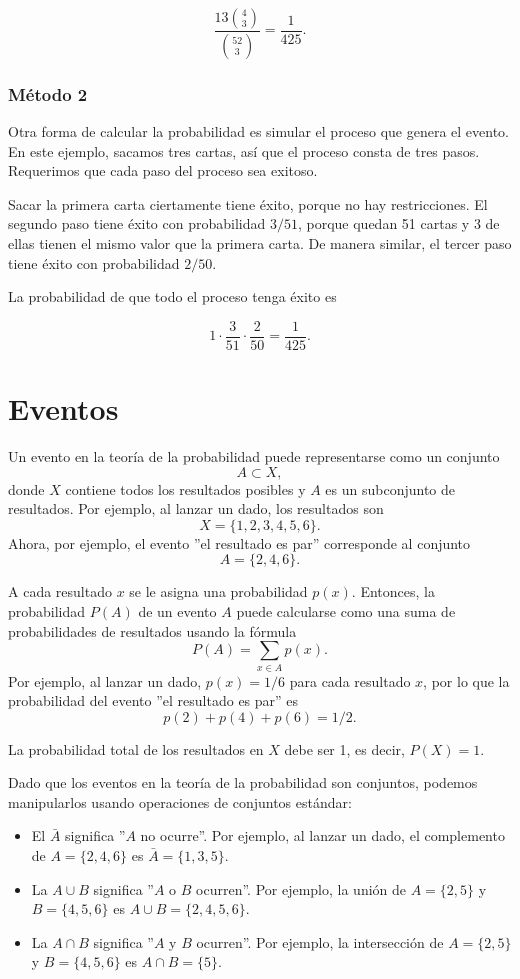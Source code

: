 \[\frac{13 {4 \choose 3}}{{52 \choose 3}} = \frac{1}{425}.\]

\subsubsection*{Método 2}

Otra forma de calcular la probabilidad es
simular el proceso que genera el evento.
En este ejemplo, sacamos tres cartas, así que el proceso
consta de tres pasos.
Requerimos que cada paso del proceso sea exitoso.

Sacar la primera carta ciertamente tiene éxito,
porque no hay restricciones.
El segundo paso tiene éxito con probabilidad $3/51$,
porque quedan 51 cartas y 3 de ellas
tienen el mismo valor que la primera carta.
De manera similar, el tercer paso tiene éxito con probabilidad $2/50$.

La probabilidad de que todo el proceso tenga éxito es

\[1 \cdot \frac{3}{51} \cdot \frac{2}{50} = \frac{1}{425}.\]

\section{Eventos}

Un evento en la teoría de la probabilidad puede representarse como un conjunto
\[A \subset X,\]
donde $X$ contiene todos los resultados posibles
y $A$ es un subconjunto de resultados.
Por ejemplo, al lanzar un dado, los resultados son
\[X = \{1,2,3,4,5,6\}.\]
Ahora, por ejemplo, el evento ''el resultado es par''
corresponde al conjunto
\[A = \{2,4,6\}.\]

A cada resultado $x$ se le asigna una probabilidad $p(x)$.
Entonces, la probabilidad $P(A)$ de un evento
$A$ puede calcularse como una suma
de probabilidades de resultados usando la fórmula
\[P(A) = \sum_{x \in A} p(x).\]
Por ejemplo, al lanzar un dado,
$p(x)=1/6$ para cada resultado $x$,
por lo que la probabilidad del evento
''el resultado es par'' es
\[p(2)+p(4)+p(6)=1/2.\]

La probabilidad total de los resultados en $X$ debe
ser 1, es decir, $P(X)=1$.

Dado que los eventos en la teoría de la probabilidad son conjuntos,
podemos manipularlos usando operaciones de conjuntos estándar:

\begin{itemize}
\item El  $\bar A$ significa
''$A$ no ocurre''.
Por ejemplo, al lanzar un dado,
el complemento de $A=\{2,4,6\}$ es
$\bar A = \{1,3,5\}$.
\item La  $A \cup B$ significa
''$A$ o $B$ ocurren''.
Por ejemplo, la unión de
$A=\{2,5\}$
y $B=\{4,5,6\}$ es
$A \cup B = \{2,4,5,6\}$.
\item La  $A \cap B$ significa
''$A$ y $B$ ocurren''.
Por ejemplo, la intersección de
$A=\{2,5\}$ y $B=\{4,5,6\}$ es
$A \cap B = \{5\}$.
\end{itemize}

